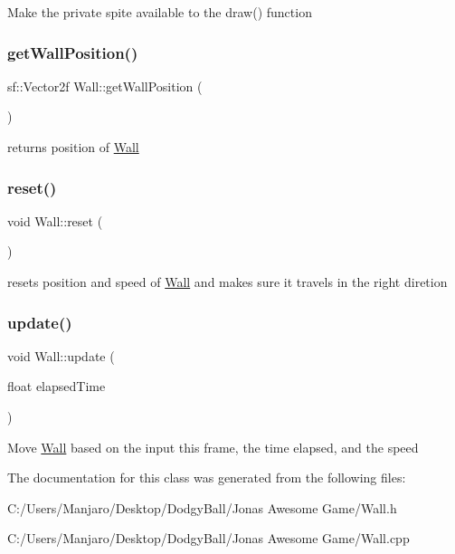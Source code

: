 Make the private spite available to the draw() function 

\mbox{\label{class_wall_a6c8d0a1ea3c60112f0394db01ee0b62d}} 
\subsubsection{\texorpdfstring{getWallPosition()}{getWallPosition()}}
{\footnotesize\ttfamily sf\+::\+Vector2f Wall\+::get\+Wall\+Position (\begin{DoxyParamCaption}{ }\end{DoxyParamCaption})}



returns position of \mbox{\hyperlink{class_wall}{Wall}} 

\mbox{\label{class_wall_a640f88f221f37e8188ec7f2bf28c1ae8}} 
\subsubsection{\texorpdfstring{reset()}{reset()}}
{\footnotesize\ttfamily void Wall\+::reset (\begin{DoxyParamCaption}{ }\end{DoxyParamCaption})}



resets position and speed of \mbox{\hyperlink{class_wall}{Wall}} and makes sure it travels in the right diretion 

\mbox{\label{class_wall_ade8bc73e97c8237d0c44f041d51d8351}} 
\subsubsection{\texorpdfstring{update()}{update()}}
{\footnotesize\ttfamily void Wall\+::update (\begin{DoxyParamCaption}\item[{float}]{elapsed\+Time }\end{DoxyParamCaption})}



Move \mbox{\hyperlink{class_wall}{Wall}} based on the input this frame, the time elapsed, and the speed 



The documentation for this class was generated from the following files\+:\begin{DoxyCompactItemize}
\item 
C\+:/\+Users/\+Manjaro/\+Desktop/\+Dodgy\+Ball/\+Jonas Awesome Game/Wall.\+h\item 
C\+:/\+Users/\+Manjaro/\+Desktop/\+Dodgy\+Ball/\+Jonas Awesome Game/Wall.\+cpp\end{DoxyCompactItemize}
